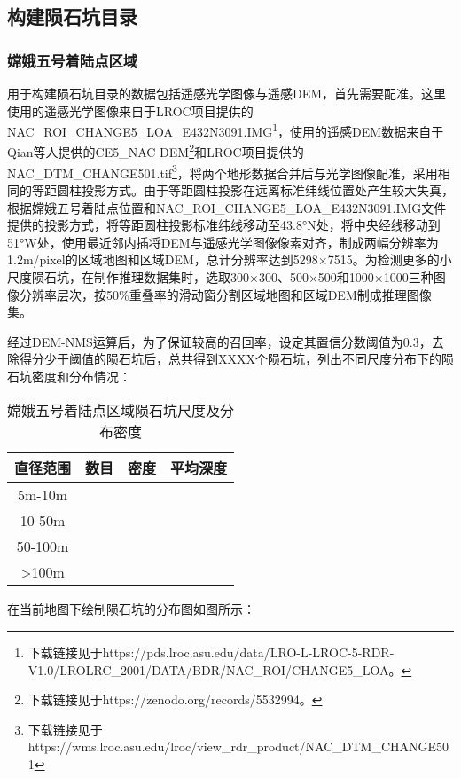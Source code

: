 \subsection{构建陨石坑目录}
\subsubsection{嫦娥五号着陆点区域}
\label{sec:chang_e_5 crater}
用于构建陨石坑目录的数据包括遥感光学图像与遥感DEM，首先需要配准。这里使用的遥感光学图像来自于LROC\cite{robinsonLunarReconnaissanceOrbiter2010}项目提供的NAC\_ROI\_CHANGE5\_LOA\_E432N3091.IMG\footnote{ 下载链接见于https://pds.lroc.asu.edu/data/LRO-L-LROC-5-RDR-V1.0/LROLRC\_2001/DATA/BDR/NAC\_ROI/CHANGE5\_LOA。}，使用的遥感DEM数据来自于Qian\cite{qianCopernicanaged200Ma2021}等人提供的CE5\_NAC DEM\footnote{下载链接见于https://zenodo.org/records/5532994。}和LROC项目提供的NAC\_DTM\_CHANGE501.tif\footnote{ 下载链接见于https://wms.lroc.asu.edu/lroc/view\_rdr\_product/NAC\_DTM\_CHANGE501}，将两个地形数据合并后与光学图像配准，采用相同的等距圆柱投影方式。由于等距圆柱投影在远离标准纬线位置处产生较大失真，根据嫦娥五号着陆点位置和NAC\_ROI\_CHANGE5\_LOA\_E432N3091.IMG文件提供的投影方式，将等距圆柱投影标准纬线移动至43.8°N处，将中央经线移动到51°W处，使用最近邻内插将DEM与遥感光学图像像素对齐，制成两幅分辨率为1.2m/pixel的区域地图和区域DEM，总计分辨率达到5298×7515。为检测更多的小尺度陨石坑，在制作推理数据集时，选取300×300、500×500和1000×1000三种图像分辨率层次，按50\%重叠率的滑动窗分割区域地图和区域DEM制成推理图像集。\par
经过DEM-NMS运算后，为了保证较高的召回率，设定其置信分数阈值为0.3，去除得分少于阈值的陨石坑后，总共得到XXXX个陨石坑，列出不同尺度分布下的陨石坑密度和分布情况：
\begin{table}[H]
  \begin{center}
  \caption{嫦娥五号着陆点区域陨石坑尺度及分布密度}
  \label{tab:chang_e_5 crater}
  \begin{tabular}{ c  c  c  c}
  \toprule
  直径范围 & 数目 & 密度 & 平均深度 \\
  \hline
  5m-10m &  &  & \\
  10-50m &  &  & \\
  50-100m &  &  & \\
  >100m &  &  & \\
  \bottomrule 
  \end{tabular}
  \end{center}
\end{table}\par
在当前地图下绘制陨石坑的分布图如图所示：

